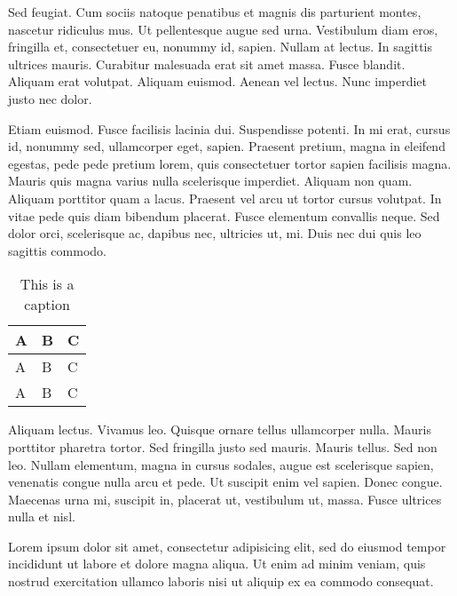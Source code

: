 Sed feugiat. Cum sociis natoque penatibus et magnis dis parturient montes,
nascetur ridiculus mus. Ut pellentesque augue sed urna. Vestibulum diam
eros, fringilla et, consectetuer eu, nonummy id, sapien. Nullam at lectus. In
sagittis ultrices mauris. Curabitur malesuada erat sit amet massa. Fusce blandit.
Aliquam erat volutpat. Aliquam euismod. Aenean vel lectus. Nunc imperdiet
justo nec dolor.

Etiam euismod. Fusce facilisis lacinia dui. Suspendisse potenti. In mi erat,
cursus id, nonummy sed, ullamcorper eget, sapien. Praesent pretium, magna
in eleifend egestas, pede pede pretium lorem, quis consectetuer tortor sapien
facilisis magna. Mauris quis magna varius nulla scelerisque imperdiet. Aliquam
non quam. Aliquam porttitor quam a lacus. Praesent vel arcu ut tortor cursus
volutpat. In vitae pede quis diam bibendum placerat. Fusce elementum convallis
neque. Sed dolor orci, scelerisque ac, dapibus nec, ultricies ut, mi. Duis nec dui
quis leo sagittis commodo.
\begin{table}[tb]
\centering
\begin{tabularx}{0.75\linewidth}{XXX}
\toprule
A & B & C\\
\midrule
A & B & C\\
A & B & C\\
\bottomrule
\end{tabularx}
\caption{This is a caption}
\end{table}

Aliquam lectus. Vivamus leo. Quisque ornare tellus ullamcorper nulla. Mauris
porttitor pharetra tortor. Sed fringilla justo sed mauris. Mauris tellus. Sed non
leo. Nullam elementum, magna in cursus sodales, augue est scelerisque sapien,
venenatis congue nulla arcu et pede. Ut suscipit enim vel sapien. Donec congue.
Maecenas urna mi, suscipit in, placerat ut, vestibulum ut, massa. Fusce ultrices
nulla et nisl.
\begin{aside}
  Lorem ipsum dolor sit amet, consectetur adipisicing elit, sed do eiusmod
  tempor incididunt ut labore et dolore magna aliqua. Ut enim ad minim veniam,
  quis nostrud exercitation ullamco laboris nisi ut aliquip ex ea commodo
  consequat.
\end{aside}

